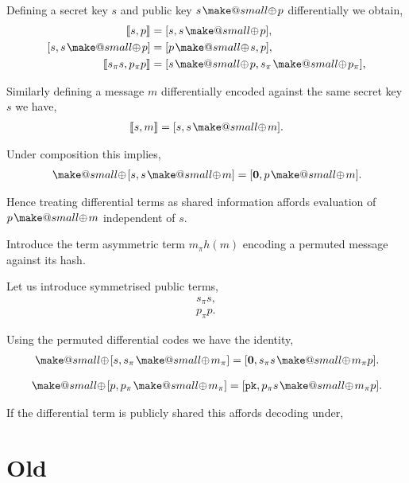 \documentclass[twocolumn, aps, amsmath, amssymb, nofootinbib, superscriptaddress, longbibliography, doublefloatfix, table-of-contents, eqsecnum, rmp]{revtex4-2}
\makeatletter
\def\diff#1#2{\llbracket #1,#2\rrbracket}
\newcommand{\soplus}{{{\hspace{1pt}}{\mathbin{\mathpalette\make@small{\mathbin\oplus}}}}{\hspace{1pt}}}
\newcommand{\make@small}[2]{%
  \vcenter{\hbox{%
    \scalebox{0.6}{$\m@th#1#2$}%
  }}%
}
\makeatother
\begin{document}
Defining a secret key $s$ and public key $s\soplus p$ differentially we obtain,
\begin{align}
	\diff{s}{p} &= [s, s\soplus p],\nonumber\\
	[s, s\soplus p] &= [p\soplus s, p],\nonumber\\
	\diff{s_\pi s}{p_\pi p} &= [s\soplus p, s_\pi\soplus p_\pi],\nonumber\\
\end{align}

Similarly defining a message $m$ differentially encoded against the same secret key $s$ we have,
\begin{align}
	\diff{s}{m} = [s,s\soplus m].
\end{align}

Under composition this implies,
\begin{align}
	[s,s\soplus p] \soplus [s,s\soplus m] = [\mathbf{0},p\soplus m].	
\end{align}

Hence treating differential terms as shared information affords evaluation of $p\soplus m$ independent of $s$.

Introduce the term asymmetric term $m_\pi h(m)$ encoding a permuted message against its hash.


Let us introduce symmetrised public terms,
\begin{align}
	s_\pi s, \nonumber\\
	p_\pi p.	
\end{align}

Using the permuted differential codes we have the identity,
\begin{align}
	[s,s \soplus p] \soplus [s, s_\pi \soplus m_\pi] = [\mathbf{0}, s_\pi s \soplus m_\pi p].
\end{align}

\begin{align}
	[s,s \soplus p] \soplus [p,p_\pi \soplus m_\pi] = [\mathtt{pk}, p_\pi s \soplus m_\pi p].
\end{align}

If the differential term is publicly shared this affords decoding under,

\section{Old}
\end{document}
